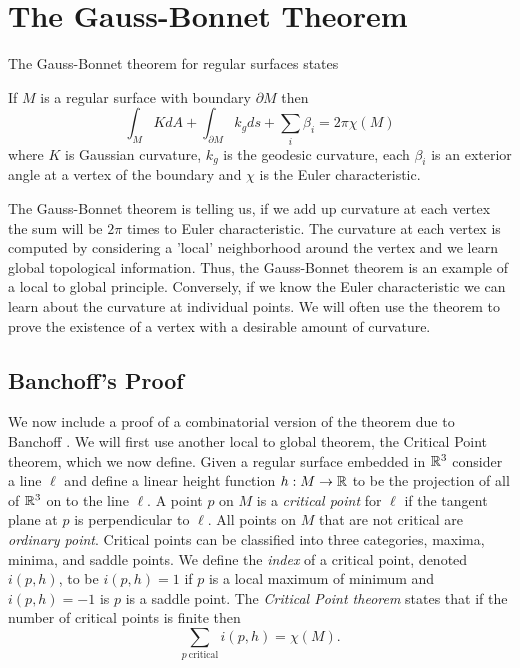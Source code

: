 \section{The Gauss-Bonnet Theorem}



The Gauss-Bonnet theorem for regular surfaces states

\begin{theorem} \label{thm:g-b-c}

If $M$ is a regular surface with boundary $\partial M$ then
	$$\int_{M} K dA+ \int_{\partial M} k_g ds + \sum_i \beta_i= 2\pi \chi(M)$$
	where  $K$ is Gaussian curvature,
	 $k_g$ is the geodesic curvature,
	 each $\beta_i$  is an exterior angle at a vertex of the boundary and
	$\chi$ is the Euler characteristic.
\end{theorem}


The  Gauss-Bonnet theorem is  telling us, if we add up curvature
at each vertex the sum will be $2\pi$ times to Euler characteristic.
The curvature at each vertex is computed by considering a 'local' neighborhood
around the vertex and we learn global topological information. Thus, the Gauss-Bonnet 
theorem is an example of a local to global principle. 
Conversely, if we know the Euler characteristic we can learn about the curvature
at individual points. We will often use the theorem to prove the existence of
a vertex with a desirable amount of curvature.



\subsection{Banchoff's Proof}
We now include a proof of a combinatorial version of the theorem due to Banchoff
\cite{banchoff_critical_1970}. We will first use another local to global theorem,
the Critical Point theorem, which we now define.
Given a regular surface embedded in $\mathbb{R}^3$ consider a line $\ell$ and define a linear height function $h:M \to \mathbb{R}$
to be the projection of all of $\mathbb{R}^3$ on to the line $\ell$. A point $p$ on $M$
is a \emph{critical point} for $\ell$ if the tangent plane at $p$ is perpendicular to $\ell$.
All points on $M$ that are not critical are \emph{ordinary point}.
Critical points can be classified into three categories, maxima, minima, and saddle points.
We define the \emph{index} of a critical point, denoted $i(p,h)$, to be 
$i(p,h)=1$ if $p$ is a  local maximum of minimum and $i(p,h)=-1$ is $p$ is a saddle point.
The \emph{Critical  Point theorem} states that if the number of critical points is finite
then 
$$\sum_{p\ \textrm{critical}} i(p,h)=\chi(M).$$




